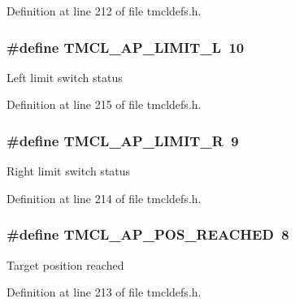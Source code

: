 Definition at line 212 of file tmcldefs.h.\hypertarget{group__ROParam_ga4751b3398d03d02e756d6b564a735b51}{
\subsubsection[{TMCL\_\-AP\_\-LIMIT\_\-L}]{\setlength{\rightskip}{0pt plus 5cm}\#define TMCL\_\-AP\_\-LIMIT\_\-L~10}}
\label{group__ROParam_ga4751b3398d03d02e756d6b564a735b51}
Left limit switch status 

Definition at line 215 of file tmcldefs.h.\hypertarget{group__ROParam_ga389a6e3b6ba6e1bc1ad719f055bf139f}{
\subsubsection[{TMCL\_\-AP\_\-LIMIT\_\-R}]{\setlength{\rightskip}{0pt plus 5cm}\#define TMCL\_\-AP\_\-LIMIT\_\-R~9}}
\label{group__ROParam_ga389a6e3b6ba6e1bc1ad719f055bf139f}
Right limit switch status 

Definition at line 214 of file tmcldefs.h.\hypertarget{group__ROParam_ga8340c6753a1858eae01d9a7a0f1ea221}{
\subsubsection[{TMCL\_\-AP\_\-POS\_\-REACHED}]{\setlength{\rightskip}{0pt plus 5cm}\#define TMCL\_\-AP\_\-POS\_\-REACHED~8}}
\label{group__ROParam_ga8340c6753a1858eae01d9a7a0f1ea221}
Target position reached 

Definition at line 213 of file tmcldefs.h.